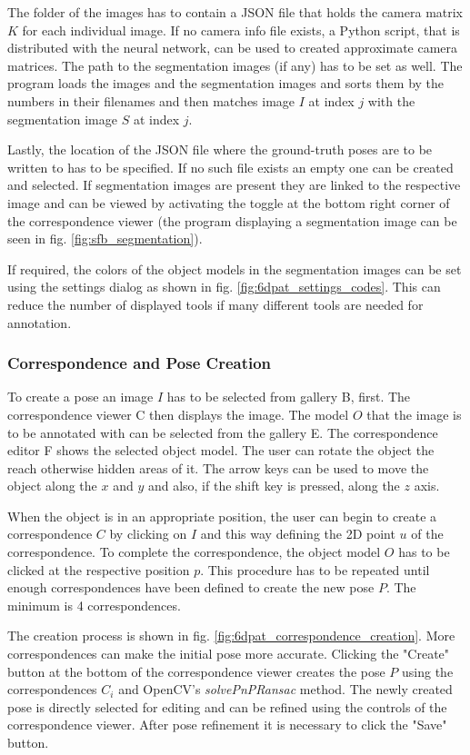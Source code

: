 The folder of the images has to contain a JSON file that holds the camera matrix $K$ for each individual image. If no camera info file exists, a Python script, that is distributed with the neural network, can be used to created approximate camera matrices. The path to the segmentation images (if any) has to be set as well. The program loads the images and the segmentation images and sorts them by the numbers in their filenames and then matches image $I$ at index $j$ with the segmentation image $S$ at index $j$. 

Lastly, the location of the JSON file where the ground-truth poses are to be written to has to be specified. If no such file exists an empty one can be created and selected. If segmentation images are present they are linked to the respective image and can be viewed by activating the toggle at the bottom right corner of the correspondence viewer (the program displaying a segmentation image can be seen in fig. \ref{fig:sfb_segmentation}). 

If required, the colors of the object models in the segmentation images can be set using the settings dialog as shown in fig. \ref{fig:6dpat_settings_codes}. This can reduce the number of displayed tools if many different tools are needed for annotation.

\subsubsection{Correspondence and Pose Creation}

To create a pose an image $I$ has to be selected from gallery B, first. The correspondence viewer C then displays the image. The model $O$ that the image is to be annotated with can be selected from the gallery E. The correspondence editor F shows the selected object model. The user can rotate the object the reach otherwise hidden areas of it. The arrow keys can be used to move the object along the $x$ and $y$ and also, if the shift key is pressed, along the $z$ axis. 

When the object is in an appropriate position, the user can begin to create a correspondence $C$ by clicking on $I$ and this way defining the 2D point $u$ of the correspondence. To complete the correspondence, the object model $O$ has to be clicked at the respective position $p$. This procedure has to be repeated until enough correspondences have been defined to create the new pose $P$. The minimum is 4 correspondences. 

The creation process is shown in fig. \ref{fig:6dpat_correspondence_creation}. More correspondences can make the initial pose more accurate. Clicking the "Create" button at the bottom of the correspondence viewer creates the pose $P$ using the correspondences $C_i$ and OpenCV's \textit{solvePnPRansac} method. The newly created pose is directly selected for editing and can be refined using the controls of the correspondence viewer. After pose refinement it is necessary to click the "Save" button. 

